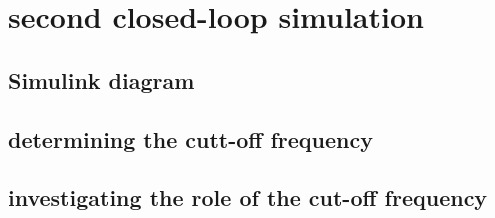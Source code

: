 \section{second closed-loop simulation}

\subsection{Simulink diagram}
\subsection{determining the cutt-off frequency}
\subsection{investigating the role of the cut-off frequency}